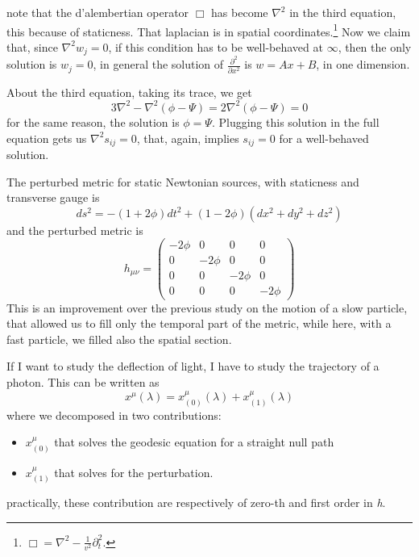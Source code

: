 note that the d'alembertian operator $\Box$ has become $\nabla ^{2}$ in the third equation, this because of staticness. That laplacian is in spatial coordinates.\footnote{ $\Box = \nabla ^{2} - \frac{1}{v^{2}}\partial_{t}^{2}$.}
Now we claim that, since $\nabla ^{2}w_{j} = 0$, if this condition has to be well-behaved at $\infty$, then the only solution is $w_{j} = 0$, in general the solution of $\frac{\partial^{2} }{\partial x^{2}} $ is $w = Ax+B$, in one dimension.\par
About the third equation, taking its trace, we get
\[
3\nabla ^{2} -\nabla ^{2} \left( \phi -\Psi  \right) = 2\nabla ^{2}\left( \phi -\Psi  \right)= 0
\]
for the same reason, the solution is $\phi =\Psi  $. Plugging this solution in the full equation gets us $\nabla ^{2}s_{ij} = 0$, that, again, implies $s_{ij} = 0$ for a well-behaved solution.\par
The perturbed metric for static Newtonian sources, with staticness and transverse gauge is
\begin{equation}
ds^{2} = - \left( 1+2\phi  \right)dt^{2}+ \left( 1-2\phi  \right)\left( dx^{2}+dy^{2}+dz^{2} \right)
\end{equation}
and the perturbed metric is
\begin{equation}
h_{\mu \nu } = \begin{pmatrix}
-2\phi  & 0 & 0 & 0 \\
0 & -2\phi  & 0 & 0 \\
0 & 0 & -2\phi  & 0 \\
0 & 0 & 0 & -2\phi 
\end{pmatrix} 
\end{equation}
This is an improvement over the previous study on the motion of a slow particle, that allowed us to fill only the temporal part of the metric, while here, with a fast particle, we filled also the spatial section.\par
If I want to study the deflection of light, I have to study the trajectory of a photon. This can be written as 
\[
x^{\mu }\left( \lambda  \right) = x^{\mu }_{\left( 0 \right)}\left( \lambda  \right) + x^{\mu }_{\left( 1 \right)}\left( \lambda  \right)
\]
where we decomposed in two contributions:
\begin{itemize}
\item $x^{\mu }_{\left( 0 \right)}$ that solves the geodesic equation for a straight null path
\item $x^{\mu }_{\left( 1 \right)}$ that solves for the perturbation.
\end{itemize}
practically, these contribution are respectively of zero-th and first order in \emph{h}.
